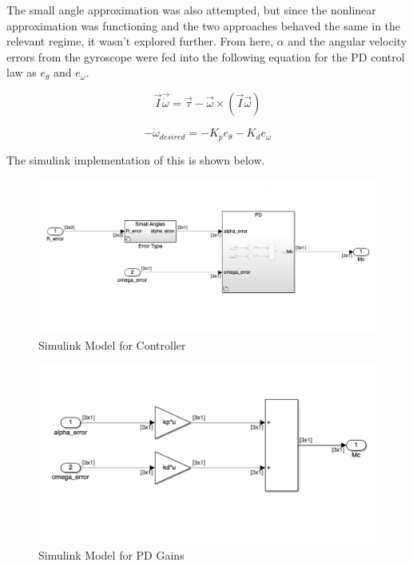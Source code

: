 The small angle approximation was also attempted, but since the nonlinear approximation was functioning and the two approaches behaved the same in the relevant regime, it wasn't explored further. From here, $\alpha$ and the angular velocity errors from the gyroscope were fed into the following equation for the PD control law as $e_\theta$ and $e_\omega$.

\begin{equation}
    \Vec{I} \Vec{\dot \omega} = \Vec{\tau} - \Vec{\omega} \times (\Vec{I} \Vec{\omega})
\end{equation}

\begin{equation}
    - \dot \omega_{desired} = -K_p e_\theta - K_d e_\omega
\end{equation}

The simulink implementation of this is shown below.

\begin{figure}[H]
    \centering
    \captionsetup{ justification = centering }
    \includegraphics[width = 15cm]{Images/PS9/controllerModel.png}
    \caption{Simulink Model for Controller}
    \label{fig:controllerSimulink}
\end{figure}

\begin{figure}[H]
    \centering
    \captionsetup{ justification = centering }
    \includegraphics[width = 15cm]{Images/PS9/PDController.png}
    \caption{Simulink Model for PD Gains}
    \label{fig:PDsimulink}
\end{figure}

